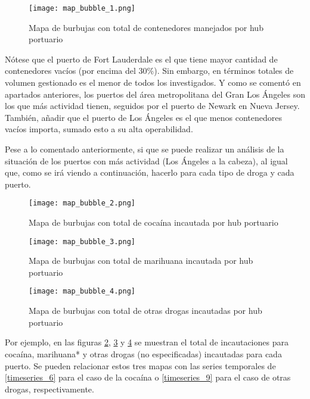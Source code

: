 \documentclass[12pt]{article}
\begin{document}
		
		\begin{figure}[H]
			\caption{\label{map_bubble_1} Mapa de burbujas con total de contenedores manejados por hub portuario}
			\centering
			\hspace*{1cm}
			\texttt{[image: map\_bubble\_1.png]}
		\end{figure}
	
		Nótese que el puerto de Fort Lauderdale es el que tiene mayor cantidad de contenedores vacíos (por encima del 30\%). Sin embargo, en términos totales de volumen gestionado es el menor de todos los investigados. Y como se comentó en apartados anteriores, los puertos del área metropolitana del Gran Los Ángeles son los que más actividad tienen, seguidos por el puerto de Newark en Nueva Jersey. También, añadir que el puerto de Los Ángeles es el que menos contenedores vacíos importa, sumado esto a su alta operabilidad.

		Pese a lo comentado anteriormente, si que se puede realizar un análisis de la situación de los puertos con más actividad (Los Ángeles a la cabeza), al igual que, como se irá viendo a continuación, hacerlo para cada tipo de droga y cada puerto.
		
		\begin{figure}[H]
			\caption{\label{map_bubble_2} Mapa de burbujas con total de cocaína incautada por hub portuario}
			\centering
			\hspace*{1cm}
			\texttt{[image: map\_bubble\_2.png]}
		\end{figure}
	
		\begin{figure}[H]
			\caption{\label{map_bubble_3} Mapa de burbujas con total de marihuana incautada por hub portuario}
			\centering
			\hspace*{1cm}
			\texttt{[image: map\_bubble\_3.png]}
		\end{figure}
	
		\begin{figure}[H]
			\caption{\label{map_bubble_4} Mapa de burbujas con total de otras drogas incautadas por hub portuario}
			\centering
			\hspace*{1cm}
			\texttt{[image: map\_bubble\_4.png]}
		\end{figure}
	
		Por ejemplo, en las figuras \ref{map_bubble_2}, \ref{map_bubble_3} y \ref{map_bubble_4} se muestran el total de incautaciones para cocaína, marihuana* y otras drogas (no especificadas) incautadas para cada puerto. Se pueden relacionar estos tres mapas con las series temporales de \ref{timeseries_6} para el caso de la cocaína o  \ref{timeseries_9} para el caso de otras drogas, respectivamente.
		
\end{document}
